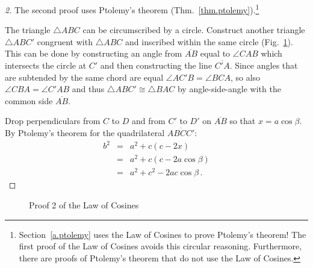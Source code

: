 \begin{proof}[2]
The second proof uses Ptolemy's theorem (Thm.~\ref{thm.ptolemy}).\footnote{Section~\ref{a.ptolemy} uses the Law of Cosines to prove Ptolemy's theorem! The first proof of the Law of Cosines avoids this circular reasoning. Furthermore, there are proofs of Ptolemy's theorem that do not use the Law of Cosines.}

The triangle $\triangle ABC$ can be circumscribed by a circle. 
Construct another triangle $\triangle ABC'$ congruent with $\triangle ABC$ and inscribed within the same circle (Fig.~\ref{f.law-cosines3}). This can be done by constructing an angle from $\overline{AB}$ equal to $\angle CAB$ which intersects the circle at $C'$ and then constructing the line $\overline{C'A}$.
Since angles that are subtended by the same chord are equal $\angle AC'B =\angle BCA$, so also $\angle CBA=\angle C'AB$ and thus $\triangle ABC'\cong\triangle BAC$ by angle-side-angle with the common side $\overline{AB}$.

Drop perpendiculars from $C$ to $D$ and from $C'$ to $D'$ on $\overline{AB}$ so that $x=a\cos \beta$. By Ptolemy's theorem for the quadrilateral $\overline{ABCC'}$:
\begin{eqnarray*}
b^2&=&a^2+c(c-2x)\\
&=& a^2 + c(c-2a\cos\beta)\\
&=&a^2+c^2-2ac\cos\beta\,.
\end{eqnarray*}
\end{proof}

\begin{figure}[t]
\begin{center}
\end{center}
\caption{Proof 2 of the Law of Cosines}\label{f.law-cosines3}
\end{figure}                       

